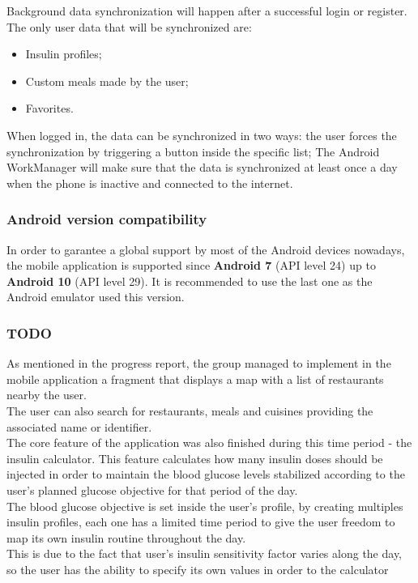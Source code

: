 Background data synchronization will happen after a successful login or register. The only user data that will be synchronized are:
\begin{itemize}
    \item Insulin profiles;
    \item Custom meals made by the user;
    \item Favorites.
\end{itemize}

When logged in, the data can be synchronized in two ways: the user forces the synchronization by triggering a button inside the specific list;
The Android WorkManager will make sure that the data is synchronized at least once a 
day when the phone is inactive and connected to the internet.

\subsubsection{Android version compatibility}

In order to garantee a global support by most of the Android devices nowadays, the mobile application is supported since \textbf{Android 7} (API level 24)
up to \textbf{Android 10} (API level 29). It is recommended to use the last one as the Android emulator used this version.

\subsubsection{TODO}
As mentioned in the progress report, the group managed to implement in the mobile application a fragment that displays a map with a list of restaurants nearby the user.\\

The user can also search for restaurants, meals and cuisines providing the associated name or identifier.\\

The core feature of the application was also finished during this time period - the insulin calculator. This feature calculates how many insulin doses should be injected
in order to maintain the blood glucose levels stabilized according to the user's planned glucose objective for that period of the day.\\

The blood glucose objective is set inside the user's profile, by creating multiples insulin profiles, each one has a limited time period to give the user freedom to map its
own insulin routine throughout the day.\\

This is due to the fact that user's insulin sensitivity factor varies along the day, so the user has the ability to specify its own values in order to the calculator\\
